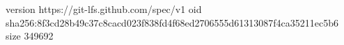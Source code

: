 version https://git-lfs.github.com/spec/v1
oid sha256:8f3cd28b49c37c8cacd023f838fd4f68ed2706555d61313087f4ca35211ec5b6
size 349692
